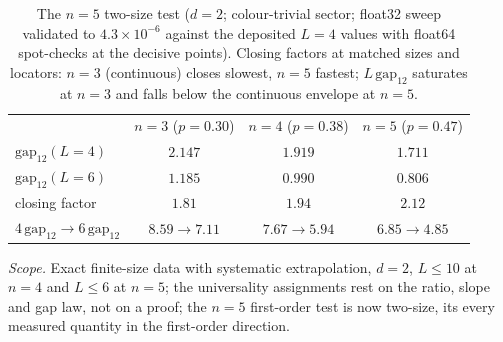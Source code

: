 \documentclass[aps,prx,reprint,superscriptaddress,nobibnotes,longbibliography]{revtex4-2}
\theoremstyle{remark}
\begin{document}
\begin{table}[t]
\caption{The $n=5$ two-size test ($d=2$; colour-trivial sector; float32
sweep validated to $4.3\times10^{-6}$ against the deposited $L=4$ values
with float64 spot-checks at the decisive points).  Closing factors at
matched sizes and locators: $n=3$ (continuous) closes slowest, $n=5$
fastest; $L\,\mathrm{gap}_{12}$ saturates at $n=3$ and falls below the
continuous envelope at $n=5$.}
\label{tab:n5twosize}
\begin{ruledtabular}
\begin{tabular}{lccc}
 & $n=3$ ($p=0.30$) & $n=4$ ($p=0.38$) & $n=5$ ($p=0.47$) \\
\colrule
$\mathrm{gap}_{12}(L{=}4)$ & $2.147$ & $1.919$ & $1.711$ \\
$\mathrm{gap}_{12}(L{=}6)$ & $1.185$ & $0.990$ & $0.806$ \\
closing factor & $1.81$ & $1.94$ & $2.12$ \\
$4\,\mathrm{gap}_{12}\to6\,\mathrm{gap}_{12}$ &
$8.59\to7.11$ & $7.67\to5.94$ & $6.85\to4.85$ \\
\end{tabular}
\end{ruledtabular}
\end{table}

\emph{Scope.}  Exact finite-size data with systematic extrapolation,
$d=2$, $L\le10$ at $n=4$ and $L\le6$ at $n=5$; the universality
assignments rest on the ratio, slope and gap law, not on a proof; the
$n=5$ first-order test is now two-size, its every measured quantity in
the first-order direction.
\end{document}
